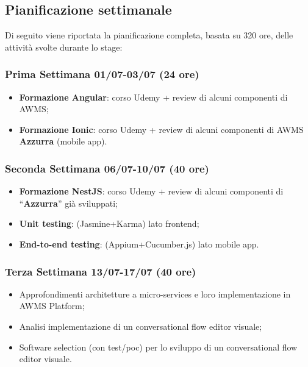 \subsection{Pianificazione settimanale}
Di seguito viene riportata la pianificazione completa, basata su 320 ore, delle attività svolte durante lo stage:
\begin{trivlist}
	\item \subsubsection{Prima Settimana 01/07-03/07 (24 ore)}   
	\begin{itemize}
		\item \textbf{Formazione Angular}: corso Udemy + review di alcuni componenti di AWMS;
		\item \textbf{Formazione Ionic}: corso Udemy + review di alcuni componenti di AWMS \textbf{Azzurra} (mobile app).
	\end{itemize}  

\item \subsubsection{Seconda Settimana 06/07-10/07 (40 ore)}
\begin{itemize}
	\item \textbf{Formazione NestJS}: corso Udemy + review di alcuni componenti di “\textbf{Azzurra}” già sviluppati;
	\item \textbf{Unit testing}: (Jasmine+Karma) lato frontend;
	\item \textbf{End-to-end testing}: (Appium+Cucumber.js) lato mobile app.
\end{itemize}

\item \subsubsection{Terza Settimana 13/07-17/07 (40 ore)}
\begin{itemize}
	\item Approfondimenti architetture a micro-services e loro implementazione in AWMS Platform;
	\item Analisi implementazione di un conversational flow editor visuale;
	\item Software selection (con test/poc) per lo sviluppo di un conversational flow editor visuale.
\end{itemize}	


\end{trivlist}
